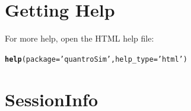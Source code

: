 \documentclass{article}\usepackage[]{graphicx}\usepackage[usenames,dvipsnames]{color}
\makeatletter
\newcommand{\hlstr}[1]{\textcolor[rgb]{0.192,0.494,0.8}{#1}}%
\newcommand{\hlstd}[1]{\textcolor[rgb]{0.345,0.345,0.345}{#1}}%
\newcommand{\hlkwc}[1]{\textcolor[rgb]{0.333,0.667,0.333}{#1}}%
\newcommand{\hlkwd}[1]{\textcolor[rgb]{0.737,0.353,0.396}{\textbf{#1}}}%
\newenvironment{kframe}{%
 \def\at@end@of@kframe{}%
 \ifinner\ifhmode%
  \def\at@end@of@kframe{\end{minipage}}%
  \begin{minipage}{\columnwidth}%
 \fi\fi%
 \def\FrameCommand##1{\hskip\@totalleftmargin \hskip-\fboxsep
 \colorbox{shadecolor}{##1}\hskip-\fboxsep
     \hskip-\linewidth \hskip-\@totalleftmargin \hskip\columnwidth}%
 \MakeFramed {\advance\hsize-\width
   \@totalleftmargin\z@ \linewidth\hsize
   \@setminipage}}%
 {\par\unskip\endMakeFramed%
 \at@end@of@kframe}
\newenvironment{knitrout}{}{} %
\makeatother
\begin{document}
\section{Getting Help}
For more help, open the HTML help file:
\begin{knitrout}
\color{fgcolor}\begin{kframe}
\begin{alltt}
\hlkwd{help}\hlstd{(}\hlkwc{package} \hlstd{=} \hlstr{'quantroSim'}\hlstd{,} \hlkwc{help_type} \hlstd{=} \hlstr{'html'}\hlstd{)}
\end{alltt}
\end{kframe}
\end{knitrout}


\section{SessionInfo}
\end{document}
